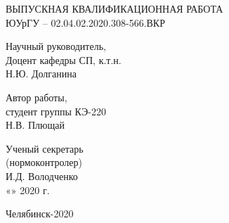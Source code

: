 \begin{titlepage}
\begin{center}
        ВЫПУСКНАЯ КВАЛИФИКАЦИОННАЯ РАБОТА\\
        ЮУрГУ – 02.04.02.2020.308-566.ВКР
    \end{center}
    \vfill

    \hfill
    \begin{minipage}{0.4\textwidth}
        Научный руководитель,\\
        Доцент кафедры СП, к.т.н.\\
        \underline{\hspace{2cm}} Н.Ю. Долганина\\
    \end{minipage}
    \bigskip
    \vfill

    \hfill
    \begin{minipage}{0.4\textwidth}
        Автор работы,\\
        студент группы КЭ-220\\
        \underline{\hspace{2cm}} Н.В. Плющай\\
    \end{minipage}
    \bigskip
    \vfill

    \hfill
    \begin{minipage}{0.4\textwidth}
        Ученый секретарь\\
        (нормоконтролер)\\
        \underline{\hspace{2cm}} И.Д. Володченко\\
        «\underline{\hspace{0.7cm}}» \underline{\hspace{2cm}} 2020 г.
    \end{minipage}
    \bigskip
    \vfill

    \begin{center}
        Челябинск-2020
    \end{center}
\end{titlepage}
